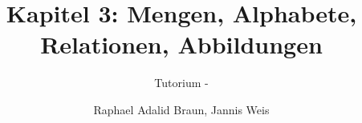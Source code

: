 \documentclass[18pt]{beamer}
\title[Mengen, Alphabete...]{Kapitel 3: Mengen, Alphabete, Relationen, Abbildungen}
\subtitle{Tutorium - } %
\author{Raphael Adalid Braun, Jannis Weis}
\institute{Grundbegriffe der Informatik | WS 2018/19}
\begin{document}

\begin{frame}
	\titlepage
\end{frame}

\title[Mengen]{}

\title[Alphabete]{}

\title[Relationen]{}

\title[Abbildungen]{}

\title[Mehr Mengen & Relationen]{}

\end{document}
